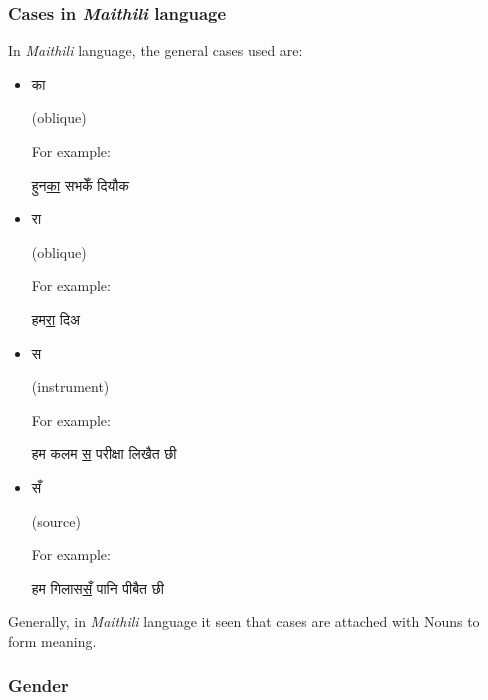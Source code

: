 \documentclass[17pt]{extarticle}
\begin{document}
\subsubsection*{Cases in \emph{Maithili} language}

In \emph{Maithili} language, the general cases used are:

\begin{itemize}
    
    \item \begin{hindi}
        का  
    \end{hindi}(oblique)

    For example: \begin{hindi}
        हुन\underline{का} सभकेँ दियौक
    \end{hindi}

    \item \begin{hindi}
        रा 
    \end{hindi}(oblique)

    For example: \begin{hindi}
        हम\underline{रा} दिअ
    \end{hindi}

    \item \begin{hindi}
        स 
    \end{hindi}(instrument)

    For example: \begin{hindi}
        हम कलम \underline{स} परीक्षा लिखैत छी
    \end{hindi}

    \item \begin{hindi}
        सँ 
    \end{hindi}(source)

    For example: \begin{hindi}
        हम गिलास\underline{सँ} पानि पीबैत छी
    \end{hindi}
    
\end{itemize}

Generally, in \emph{Maithili} language it seen that cases are attached with Nouns to form meaning.

\subsubsection*{Gender}
\end{document}
